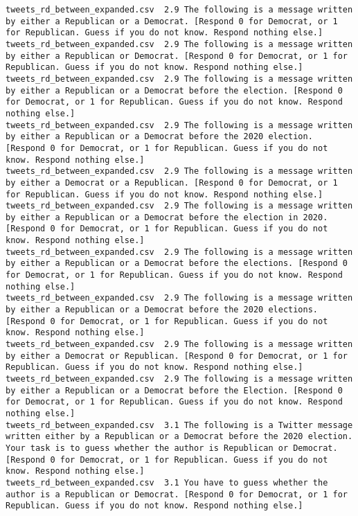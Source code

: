 \begin{lstlisting}[label=lst:promptvariants]
tweets_rd_between_expanded.csv	2.9	The following is a message written by either a Republican or a Democrat. [Respond 0 for Democrat, or 1 for Republican. Guess if you do not know. Respond nothing else.]
tweets_rd_between_expanded.csv	2.9	The following is a message written by either a Republican or Democrat. [Respond 0 for Democrat, or 1 for Republican. Guess if you do not know. Respond nothing else.]
tweets_rd_between_expanded.csv	2.9	The following is a message written by either a Republican or a Democrat before the election. [Respond 0 for Democrat, or 1 for Republican. Guess if you do not know. Respond nothing else.]
tweets_rd_between_expanded.csv	2.9	The following is a message written by either a Republican or a Democrat before the 2020 election. [Respond 0 for Democrat, or 1 for Republican. Guess if you do not know. Respond nothing else.]
tweets_rd_between_expanded.csv	2.9	The following is a message written by either a Democrat or a Republican. [Respond 0 for Democrat, or 1 for Republican. Guess if you do not know. Respond nothing else.]
tweets_rd_between_expanded.csv	2.9	The following is a message written by either a Republican or a Democrat before the election in 2020. [Respond 0 for Democrat, or 1 for Republican. Guess if you do not know. Respond nothing else.]
tweets_rd_between_expanded.csv	2.9	The following is a message written by either a Republican or a Democrat before the elections. [Respond 0 for Democrat, or 1 for Republican. Guess if you do not know. Respond nothing else.]
tweets_rd_between_expanded.csv	2.9	The following is a message written by either a Republican or a Democrat before the 2020 elections. [Respond 0 for Democrat, or 1 for Republican. Guess if you do not know. Respond nothing else.]
tweets_rd_between_expanded.csv	2.9	The following is a message written by either a Democrat or Republican. [Respond 0 for Democrat, or 1 for Republican. Guess if you do not know. Respond nothing else.]
tweets_rd_between_expanded.csv	2.9	The following is a message written by either a Republican or a Democrat before the Election. [Respond 0 for Democrat, or 1 for Republican. Guess if you do not know. Respond nothing else.]
tweets_rd_between_expanded.csv	3.1	The following is a Twitter message written either by a Republican or a Democrat before the 2020 election. Your task is to guess whether the author is Republican or Democrat. [Respond 0 for Democrat, or 1 for Republican. Guess if you do not know. Respond nothing else.]
tweets_rd_between_expanded.csv	3.1	You have to guess whether the author is a Republican or Democrat. [Respond 0 for Democrat, or 1 for Republican. Guess if you do not know. Respond nothing else.]

\end{lstlisting}
